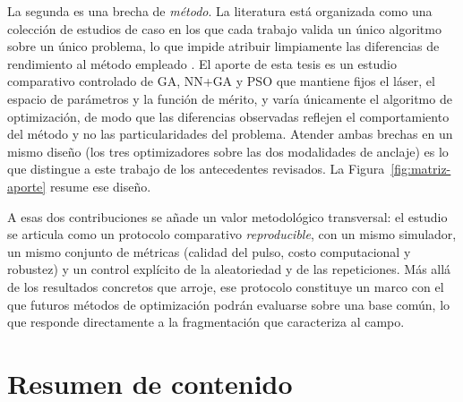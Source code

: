 La segunda es una brecha de \emph{método}. La literatura está organizada como una colección de estudios de caso en los que cada trabajo valida un único algoritmo sobre un único problema, lo que impide atribuir limpiamente las diferencias de rendimiento al método empleado \cite{Genty2021}. El aporte de esta tesis es un estudio comparativo controlado de GA, NN+GA y PSO que mantiene fijos el láser, el espacio de parámetros y la función de mérito, y varía únicamente el algoritmo de optimización, de modo que las diferencias observadas reflejen el comportamiento del método y no las particularidades del problema. Atender ambas brechas en un mismo diseño (los tres optimizadores sobre las dos modalidades de anclaje) es lo que distingue a este trabajo de los antecedentes revisados. La Figura~\ref{fig:matriz-aporte} resume ese diseño.

A esas dos contribuciones se añade un valor metodológico transversal: el estudio se articula como un protocolo comparativo \emph{reproducible}, con un mismo simulador, un mismo conjunto de métricas (calidad del pulso, costo computacional y robustez) y un control explícito de la aleatoriedad y de las repeticiones. Más allá de los resultados concretos que arroje, ese protocolo constituye un marco con el que futuros métodos de optimización podrán evaluarse sobre una base común, lo que responde directamente a la fragmentación que caracteriza al campo.


\section{Resumen de contenido}
\label{sec:estructura-documento}
 
